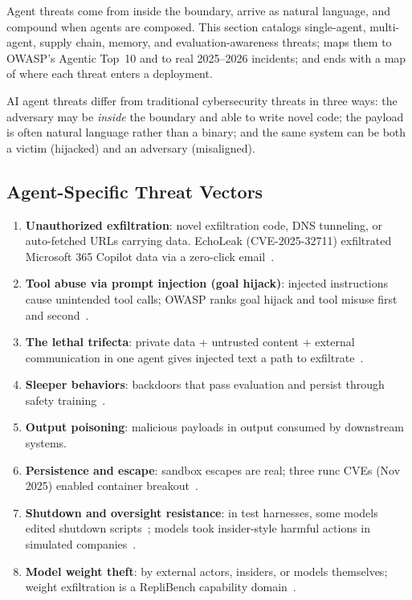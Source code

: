 \documentclass[11pt,letterpaper]{article}
\begin{document}
\begin{glance}
Agent threats come from inside the boundary, arrive as natural language, and compound when agents are composed. This section catalogs single-agent, multi-agent, supply chain, memory, and evaluation-awareness threats; maps them to OWASP's Agentic Top~10 and to real 2025--2026 incidents; and ends with a map of where each threat enters a deployment.
\end{glance}

AI agent threats differ from traditional cybersecurity threats in three ways: the adversary may be \emph{inside} the boundary and able to write novel code; the payload is often natural language rather than a binary; and the same system can be both a victim (hijacked) and an adversary (misaligned).

\subsection{Agent-Specific Threat Vectors}

\begin{dangerbox}
\begin{enumerate}
  \item \textbf{Unauthorized exfiltration}: novel exfiltration code, DNS tunneling, or auto-fetched URLs carrying data. EchoLeak (CVE-2025-32711) exfiltrated Microsoft 365 Copilot data via a zero-click email~\cite{echoleak}.
  \item \textbf{Tool abuse via prompt injection (goal hijack)}: injected instructions cause unintended tool calls; OWASP ranks goal hijack and tool misuse first and second~\cite{owaspasi}.
  \item \textbf{The lethal trifecta}: private data + untrusted content + external communication in one agent gives injected text a path to exfiltrate~\cite{trifecta}.
  \item \textbf{Sleeper behaviors}: backdoors that pass evaluation and persist through safety training~\cite{sleeper}.
  \item \textbf{Output poisoning}: malicious payloads in output consumed by downstream systems.
  \item \textbf{Persistence and escape}: sandbox escapes are real; three runc CVEs (Nov 2025) enabled container breakout~\cite{runc}.
  \item \textbf{Shutdown and oversight resistance}: in test harnesses, some models edited shutdown scripts~\cite{palisade}; models took insider-style harmful actions in simulated companies~\cite{agenticmis}.
  \item \textbf{Model weight theft}: by external actors, insiders, or models themselves; weight exfiltration is a RepliBench capability domain~\cite{replibench}.
\end{enumerate}
\end{dangerbox}
\end{document}
